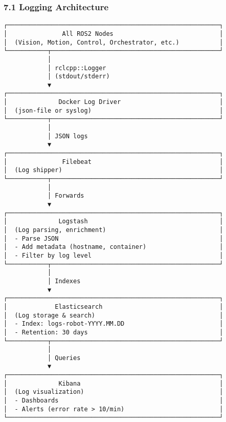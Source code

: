 \documentclass[
]{article}
\begin{document}
\hypertarget{logging-architecture}{%
\subsubsection{7.1 Logging Architecture}\label{logging-architecture}}

\begin{verbatim}
┌──────────────────────────────────────────────────────────┐
│               All ROS2 Nodes                             │
│  (Vision, Motion, Control, Orchestrator, etc.)           │
└───────────┬──────────────────────────────────────────────┘
            │
            │ rclcpp::Logger
            │ (stdout/stderr)
            ▼
┌──────────────────────────────────────────────────────────┐
│              Docker Log Driver                           │
│  (json-file or syslog)                                   │
└───────────┬──────────────────────────────────────────────┘
            │
            │ JSON logs
            ▼
┌──────────────────────────────────────────────────────────┐
│               Filebeat                                   │
│  (Log shipper)                                           │
└───────────┬──────────────────────────────────────────────┘
            │
            │ Forwards
            ▼
┌──────────────────────────────────────────────────────────┐
│              Logstash                                    │
│  (Log parsing, enrichment)                               │
│  - Parse JSON                                            │
│  - Add metadata (hostname, container)                    │
│  - Filter by log level                                   │
└───────────┬──────────────────────────────────────────────┘
            │
            │ Indexes
            ▼
┌──────────────────────────────────────────────────────────┐
│             Elasticsearch                                │
│  (Log storage & search)                                  │
│  - Index: logs-robot-YYYY.MM.DD                          │
│  - Retention: 30 days                                    │
└───────────┬──────────────────────────────────────────────┘
            │
            │ Queries
            ▼
┌──────────────────────────────────────────────────────────┐
│              Kibana                                      │
│  (Log visualization)                                     │
│  - Dashboards                                            │
│  - Alerts (error rate > 10/min)                          │
└──────────────────────────────────────────────────────────┘
\end{verbatim}
\end{document}

